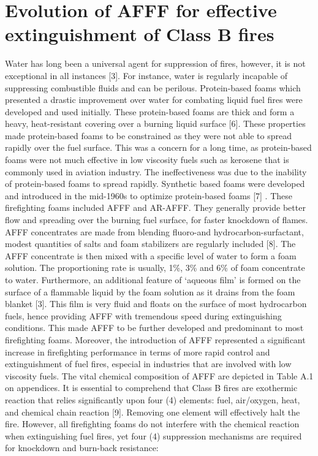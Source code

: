 \documentclass[12pt]{report}
\begin{document}
\section{Evolution of AFFF for effective extinguishment of Class B fires}
Water has long been a universal agent for suppression of fires, however, it is not exceptional in all instances [3]. For instance, water is regularly incapable of suppressing combustible fluids and can be perilous. Protein-based foams which presented a drastic improvement over water for combating liquid fuel fires were developed and used initially. These protein-based foams are thick and form a heavy, heat-resistant covering over a burning liquid surface [6]. These properties made protein-based foams to be constrained as they were not able to spread rapidly over the fuel surface. This was a concern for a long time, as protein-based foams were not much effective in low viscosity fuels such as kerosene that is commonly used in aviation industry. The ineffectiveness was due to the inability of protein-based foams to spread rapidly.
Synthetic based foams were developed and introduced in the mid-1960s to optimize protein-based foams [7] . These firefighting foams included AFFF and AR-AFFF. They generally provide better flow and spreading over the burning fuel surface, for faster knockdown of flames. AFFF concentrates are made from blending fluoro-and hydrocarbon-surfactant, modest quantities of salts and foam stabilizers are regularly included [8]. The AFFF concentrate is then mixed with a specific level of water to form a foam solution. The proportioning rate is usually, 1\%, 3\% and 6\% of foam concentrate to water. Furthermore, an additional feature of ‘aqueous film’ is formed on the surface of a flammable liquid by the foam solution as it drains from the foam blanket [3]. This film is very fluid and floats on the surface of most hydrocarbon fuels, hence providing AFFF with tremendous speed during extinguishing conditions. This made AFFF to be further developed and predominant to most firefighting foams. Moreover, the introduction of AFFF represented a significant increase in firefighting performance in terms of more rapid control and extinguishment of fuel fires, especial in industries that are involved with low viscosity fuels. The vital chemical composition of AFFF are depicted in Table A.1 on appendices.
It is essential to comprehend that Class B fires are exothermic reaction that relies significantly upon four (4) elements: fuel, air/oxygen, heat, and chemical chain reaction [9]. Removing one element will effectively halt the fire.  However, all firefighting foams do not interfere with the chemical reaction when extinguishing fuel fires, yet four (4) suppression mechanisms are required for knockdown and burn-back resistance:
\end{document}
